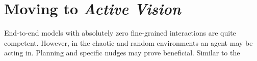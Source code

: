 \section{Moving to \emph{Active Vision}}
End-to-end models with absolutely zero fine-grained interactions are quite competent. However, in the chaotic and random environments an agent may be acting in. Planning and specific nudges may prove beneficial. Similar to the 




